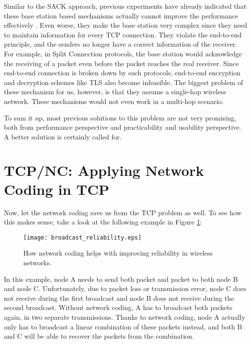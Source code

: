 \documentclass[10pt, conference, final, letterpaper]{IEEEtran}
\theoremstyle{definition}
\begin{document}
Similar to the SACK approach, previous experiments have already indicated that these base station based mechanisms actually cannot improve the performance effectively \cite{TCPWireless}. Even worse, they make the base station very complex since they need to maintain information for every TCP connection. They violate the end-to-end principle, and the senders no longer have a correct information of the receiver. For example, in Split Connection protocols, the base station would acknowledge the receiving of a packet even before the packet reaches the real receiver. Since end-to-end connection is broken down by such protocols, end-to-end encryption and decryption schemes like TLS \cite{TLS-RFC} also become infeasible. 
The biggest problem of these mechanism for us, however, is that they assume a single-hop wireless network. These mechanisms would not even work in a multi-hop scenario.

To sum it up, most previous solutions to this problem are not very promising, both from performance perspective and practicability and usability perspective. A better solution is certainly called for. 

\section{TCP/NC: Applying Network Coding in TCP}
\label{sec:TCPNC}

Now, let the network coding save us from the TCP problem as well. To see how this makes sense, take a look at the following example in Figure \ref{fig:reliability}: 

\begin{figure}[hbt]
	\begin{center}
		\texttt{[image: broadcast\_reliability.eps]}
	\end{center}
	\caption{How network coding helps with improving reliability in wireless networks. \cite{TCPNC}}
	\label{fig:reliability}
\end{figure}

In this example, node A needs to send both packet  and packet  to both node B and node C. Unfortunately, due to packet loss or transmission error, node C does not receive  during the first broadcast and node B does not receive  during the second broadcast. Without network coding, A has to broadcast both packets again, in two separate transmissions. Thanks to network coding, node A actually only has to broadcast a linear combination of these packets instead, and both B and C will be able to recover the packets from the combination.
\end{document}
